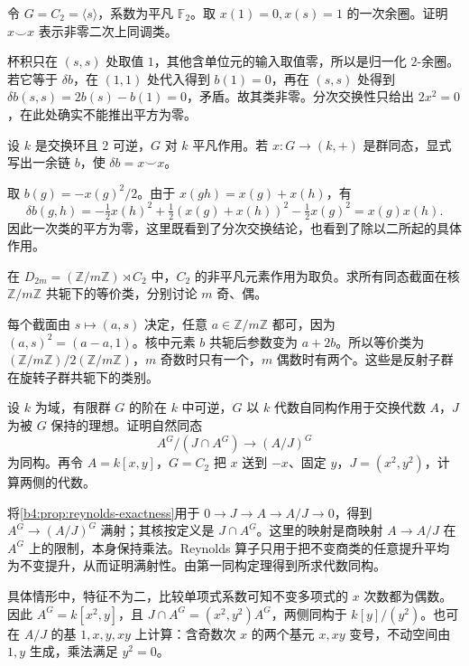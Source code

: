 \begin{exercise}\label{b4:ex:11-cup-square-characteristic-two}
	令 \(G=C_2=\langle s\rangle\)，系数为平凡 \(\mathbb F_2\)。取 \(x(1)=0,x(s)=1\) 的一次余圈。证明 \(x\smile x\) 表示非零二次上同调类。
\end{exercise}
\begin{solution}
	杯积只在 \((s,s)\) 处取值 \(1\)，其他含单位元的输入取值零，所以是归一化 \(2\)-余圈。若它等于 \(\delta b\)，在 \((1,1)\) 处代入得到 \(b(1)=0\)，再在 \((s,s)\) 处得到 \(\delta b(s,s)=2b(s)-b(1)=0\)，矛盾。故其类非零。分次交换性只给出 \(2x^2=0\)，在此处确实不能推出平方为零。
\end{solution}

\begin{exercise}\label{b4:ex:11-cup-square-odd}
	设 \(k\) 是交换环且 \(2\) 可逆，\(G\) 对 \(k\) 平凡作用。若 \(x:G\to(k,+)\) 是群同态，显式写出一余链 \(b\)，使 \(\delta b=x\smile x\)。
\end{exercise}
\begin{solution}
	取 \(b(g)=-x(g)^2/2\)。由于 \(x(gh)=x(g)+x(h)\)，有
	\[
		\delta b(g,h) =-\tfrac12x(h)^2+\tfrac12(x(g)+x(h))^2-\tfrac12x(g)^2 =x(g)x(h).
	\]
	因此一次类的平方为零，这里既看到了分次交换结论，也看到了除以二所起的具体作用。
\end{solution}

\begin{exercise}\label{b4:ex:11-dihedral-complements}
	在 \(D_{2m}=(\mathbb Z/m\mathbb Z)\rtimes C_2\) 中，\(C_2\) 的非平凡元素作用为取负。求所有同态截面在核 \(\mathbb Z/m\mathbb Z\) 共轭下的等价类，分别讨论 \(m\) 奇、偶。
\end{exercise}
\begin{solution}
	每个截面由 \(s\mapsto(a,s)\) 决定，任意 \(a\in\mathbb Z/m\mathbb Z\) 都可，因为 \((a,s)^2=(a-a,1)\)。核中元素 \(b\) 共轭后参数变为 \(a+2b\)。所以等价类为 \((\mathbb Z/m\mathbb Z)/2(\mathbb Z/m\mathbb Z)\)，\(m\) 奇数时只有一个，\(m\) 偶数时有两个。这些是反射子群在旋转子群共轭下的类别。
\end{solution}

\begin{exercise}\label{b4:ex:11-invariant-quotient}
	设 \(k\) 为域，有限群 \(G\) 的阶在 \(k\) 中可逆，\(G\) 以 \(k\) 代数自同构作用于交换代数 \(A\)，\(J\) 为被 \(G\) 保持的理想。证明自然同态
	\[
		A^G/(J\cap A^G)\longrightarrow(A/J)^G
	\]
	为同构。再令 \(A=k[x,y]\)，\(G=C_2\) 把 \(x\) 送到 \(-x\)、固定 \(y\)，\(J=(x^2,y^2)\)，计算两侧的代数。
\end{exercise}
\begin{solution}
	将\cref{b4:prop:reynolds-exactness}用于 \(0\to J\to A\to A/J\to0\)，得到 \(A^G\to(A/J)^G\) 满射；其核按定义是 \(J\cap A^G\)。这里的映射是商映射 \(A\to A/J\) 在 \(A^G\) 上的限制，本身保持乘法。Reynolds 算子只用于把不变商类的任意提升平均为不变提升，从而证明满射性。由第一同构定理得到所求代数同构。

	具体情形中，特征不为二，比较单项式系数可知不变多项式的 \(x\) 次数都为偶数。因此 \(A^G=k[x^2,y]\)，且 \(J\cap A^G=(x^2,y^2)A^G\)，两侧同构于 \(k[y]/(y^2)\)。也可在 \(A/J\) 的基 \(1,x,y,xy\) 上计算：含奇数次 \(x\) 的两个基元 \(x,xy\) 变号，不动空间由 \(1,y\) 生成，乘法满足 \(y^2=0\)。
\end{solution}

